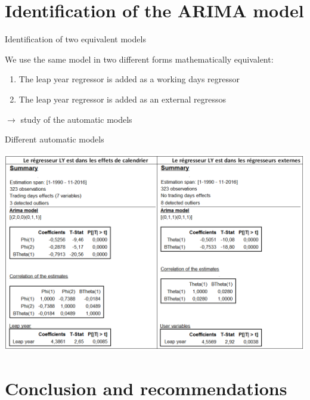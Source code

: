 \documentclass[10pt,xcolor=table,color={dvipsnames,usenames},ignorenonframetext,usepdftitle=false,french]{beamer}
\begin{document}
\section{Identification of the ARIMA
model}\label{identification-of-the-arima-model}

\begin{frame}{Identification of two equivalent models}

We use the same model in two different forms mathematically equivalent:

\begin{enumerate}
\def\labelenumi{\arabic{enumi}.}
\item
  The leap year regressor is added as a working days regressor
\item
  The leap year regressor is added as an external regressos
\end{enumerate}

\(\rightarrow\) study of the automatic models

\end{frame}

\begin{frame}{Different automatic models}

\centering
\includegraphics[width = \textwidth]{img/CholeskyRF241.png}

\end{frame}

\section{Conclusion and
recommendations}\label{conclusion-and-recommendations}
\end{document}

